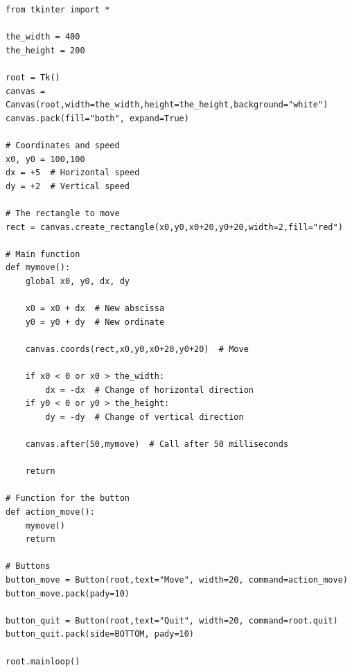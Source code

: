 \documentclass[11pt,class=report,crop=false]{standalone}
\begin{document}
\begin{lstlisting}
from tkinter import *

the_width = 400
the_height = 200

root = Tk()     
canvas = Canvas(root,width=the_width,height=the_height,background="white")
canvas.pack(fill="both", expand=True)

# Coordinates and speed
x0, y0 = 100,100
dx = +5  # Horizontal speed
dy = +2  # Vertical speed

# The rectangle to move
rect = canvas.create_rectangle(x0,y0,x0+20,y0+20,width=2,fill="red")

# Main function
def mymove():
    global x0, y0, dx, dy

    x0 = x0 + dx  # New abscissa
    y0 = y0 + dy  # New ordinate

    canvas.coords(rect,x0,y0,x0+20,y0+20)  # Move

    if x0 < 0 or x0 > the_width:
        dx = -dx  # Change of horizontal direction
    if y0 < 0 or y0 > the_height:
        dy = -dy  # Change of vertical direction

    canvas.after(50,mymove)  # Call after 50 milliseconds
 
    return
    
# Function for the button
def action_move():
    mymove()
    return

# Buttons
button_move = Button(root,text="Move", width=20, command=action_move)
button_move.pack(pady=10)

button_quit = Button(root,text="Quit", width=20, command=root.quit)
button_quit.pack(side=BOTTOM, pady=10)

root.mainloop()
\end{lstlisting}
\end{document}
